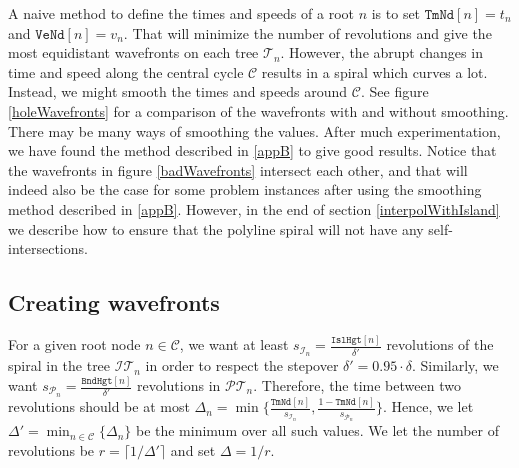 \documentclass[3p]{elsarticle}
\newcommand{\comm}[1] {}
\newcommand{\VD}{\mathcal{VD}}
\newcommand{\PP}{\mathcal{P}}
\newcommand{\HH}{\mathcal{I}}
\newcommand{\CC}{\mathcal{C}}
\newcommand{\TT}{\mathcal{T}}
\newcommand{\PT}{\PP\TT}
\newcommand{\HT}{\HH\TT}
\newcommand{\stepover}{\delta}
\newcommand{\tStepover}{\Delta}
\newcommand{\ttimeO}{\texttt{TmNd}}
\newcommand{\speedO}{\texttt{VeNd}}
\newcommand{\height}{\texttt{Hgt}}
\newcommand{\holeHeight}{\texttt{Isl}\height}
\newcommand{\boundaryHeight}{\texttt{Bnd}\height}
\begin{document}
A naive method to define the times and speeds of a root $n$ is to set
$\ttimeO[n]=t_n$ and $\speedO[n]=v_n$.\comm{\begin{equation*}
\begin{split}
&\ttimeO[n]=t_n,\\
&\speedO[n]=v_n.
\end{split}
\end{equation*}} That will
minimize the number of revolutions and give the most equidistant
wavefronts on each tree $\TT_n$. However, the abrupt changes in time and speed along the central cycle
$\CC$ results in a spiral which curves a lot. Instead, we might smooth the times and
speeds around $\CC$. See figure \ref{holeWavefronts}
for a comparison of the wavefronts with and without smoothing.
There may be many ways of smoothing the values. After much experimentation, we
have found the method described in \ref{appB} to give good results.
Notice that the wavefronts in figure \ref{badWavefronts} intersect each other, and
that will indeed also be the case for some problem instances after using the
smoothing method described in \ref{appB}.
However, in the end of section \ref{interpolWithIsland} we describe how to ensure that the
polyline spiral will not have any self-intersections.

\begin{figure*}
\centering
{}\quad
{}
\caption{
 Wavefronts in red when the times and speeds of the wave in the root nodes
have been defined as described in \ref{appB}. $\CC$ is in blue and the rest of $\VD$ is in gray.
 Wavefronts when the preferred times and speeds have been used
to define the movement of the wave.
}
\label{holeWavefronts}
\end{figure*}

\subsection{Creating wavefronts}

For a given root node $n\in\CC$, we want at least
$s_{\HH_n}=\frac{\holeHeight[n]}{\stepover'}$
revolutions of the spiral in the tree $\HT_n$ in order to respect the stepover $\stepover'=0.95\cdot\stepover$.
Similarly, we want $s_{\PP_n}=\frac{\boundaryHeight[n]}{\stepover'}$ revolutions in
$\PT_n$. Therefore, the time between two revolutions should be
at most $\tStepover_n=\min\{\frac{\ttimeO[n]}{s_{\HH_n}},\frac{1-\ttimeO[n]}{s_{\PP_n}}\}$.
Hence, we let $\tStepover'=\min_{n\in\CC}\{\tStepover_n\}$ be the minimum over all such values.
We let the number of revolutions be $r=\lceil 1/\tStepover'\rceil$ and set
$\tStepover=1/r$.
\end{document}
